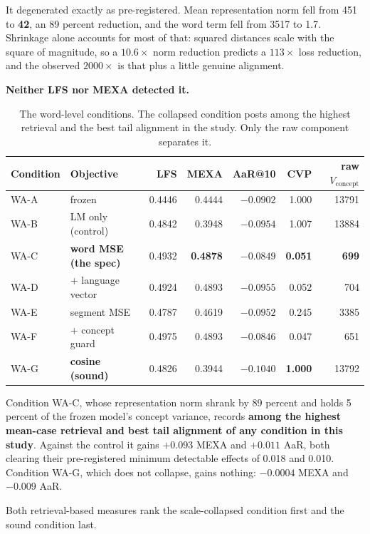 \documentclass[11pt,a4paper]{article}
\begin{document}
It degenerated exactly as pre-registered. Mean representation norm fell from
451 to \textbf{42}, an 89 percent reduction, and the word term fell from 3517
to 1.7. Shrinkage alone accounts for most of that: squared distances scale
with the square of magnitude, so a $10.6\times$ norm reduction predicts a
$113\times$ loss reduction, and the observed $2000\times$ is that plus a
little genuine alignment.

\textbf{Neither LFS nor MEXA detected it.}

\begin{table}[H]
\centering
\small
\caption{The word-level conditions. The collapsed condition posts among the highest retrieval and
the best tail alignment in the study. Only the raw component separates it.}
\begin{tabular}{llrrrrr}
\toprule
Condition & Objective & LFS & MEXA & AaR@10 & CVP & raw $V_{\mathrm{concept}}$ \\
\midrule
WA-A & frozen                 & 0.4446 & 0.4444 & $-0.0902$ & 1.000 & 13791 \\
WA-B & LM only (control)      & 0.4842 & 0.3948 & $-0.0954$ & 1.007 & 13884 \\
WA-C & \textbf{word MSE (the spec)} & 0.4932 & \textbf{0.4878} & \textbf{$-0.0849$} & \textbf{0.051} & \textbf{699} \\
WA-D & + language vector      & 0.4924 & 0.4893 & $-0.0955$ & 0.052 & 704 \\
WA-E & segment MSE            & 0.4787 & 0.4619 & $-0.0952$ & 0.245 & 3385 \\
WA-F & + concept guard        & 0.4975 & 0.4893 & $-0.0846$ & 0.047 & 651 \\
WA-G & \textbf{cosine (sound)}& 0.4826 & 0.3944 & $-0.1040$ & \textbf{1.000} & 13792 \\
\bottomrule
\end{tabular}
\end{table}

Condition WA-C, whose representation norm shrank by 89 percent and holds 5 percent of the frozen
model's concept variance, records \textbf{among the highest mean-case retrieval and
best tail alignment of any condition in this study}. Against the control it gains
$+0.093$ MEXA and $+0.011$ AaR, both clearing their pre-registered minimum
detectable effects of 0.018 and 0.010. Condition WA-G, which does not collapse,
gains nothing: $-0.0004$ MEXA and $-0.009$ AaR.

Both retrieval-based measures rank the scale-collapsed condition first and the
sound condition last.
\end{document}
